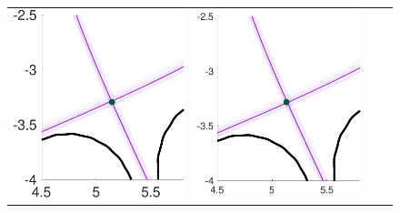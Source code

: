 \documentclass{beamer}
\begin{document}
\begin{frame}[t]
\begin{itemize}[leftmargin=5pt]
\begin{figure}[ht!]
{\begin{tabular}{cccc}
\includegraphics[width=1\linewidth]{./figures_slides/QoI_MC_uniform_xptRegion.pdf} 
&\includegraphics[width=1\linewidth]{./figures_slides/QoI_MFMC_xptRegion.pdf} 

\end{tabular}}
\end{figure}
\end{itemize}
\end{frame}
\end{document}
